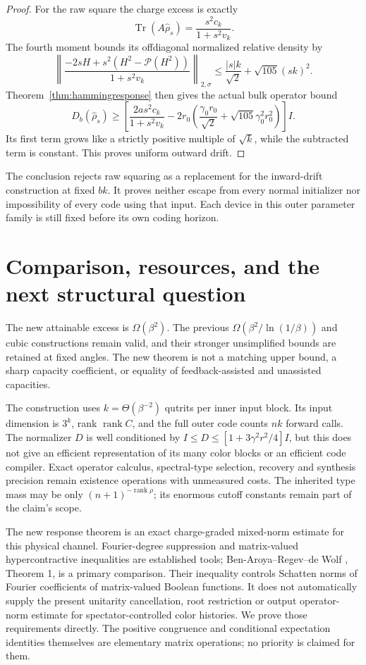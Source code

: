 \documentclass[11pt]{article}
\newcommand{\Tr}{\operatorname{Tr}}
\newcommand{\rank}{\operatorname{rank}}
\newcommand{\pin}{\mathcal P}
\begin{document}
\begin{proof}
For the raw square the charge excess is exactly
\[
 \Tr(A\widehat\rho_s)=\frac{s^2c_k}{1+s^2v_k}.
\]
The fourth moment bounds its offdiagonal normalized relative density by
\[
 \left\|\frac{-2sH+s^2(H^2-\pin(H^2))}{1+s^2v_k}\right\|_{2,\sigma}
 \le\frac{|s|k}{\sqrt2}+\sqrt{105}(sk)^2.
\]
Theorem~\ref{thm:hammingresponse} then gives the actual bulk operator bound
\[
 D_b(\widehat\rho_s)\ge
 \left[\frac{2a s^2c_k}{1+s^2v_k}
 -2r_0\left(\frac{\gamma_0r_0}{\sqrt2}
                  +\sqrt{105}\gamma_0^2r_0^2\right)\right]I.
\]
Its first term grows like a strictly positive multiple of \(\sqrt k\),
while the subtracted term is constant. This proves uniform outward drift.
\end{proof}

The conclusion rejects raw squaring as a replacement for the inward-drift
construction at fixed \(bk\). It proves neither escape from every normal
initializer nor impossibility of every code using that input. Each device
in this outer parameter family is still fixed before its own coding horizon.

\section{Comparison, resources, and the next structural question}

The new attainable excess is \(\Omega(\beta^2)\). The previous
\(\Omega(\beta^2/\ln(1/\beta))\) and cubic constructions remain valid,
and their stronger unsimplified bounds are retained at fixed angles.
The new theorem is not a matching upper bound, a sharp capacity coefficient,
or equality of feedback-assisted and unassisted capacities.

The construction uses \(k=\Theta(\beta^{-2})\) qutrits per inner input
block. Its input dimension is \(3^k\), rank \(\rank C\), and the full
outer code counts \(nk\) forward calls. The normalizer \(D\) is well
conditioned by \(I\le D\le[1+3\gamma^2r^2/4]I\), but this does not
give an efficient representation of its many color blocks or an efficient
code compiler. Exact operator calculus, spectral-type selection, recovery
and synthesis precision remain existence operations with unmeasured costs.
The inherited type mass may be only \((n+1)^{-\rank\rho}\); its enormous
cutoff constants remain part of the claim's scope.

The new response theorem is an exact charge-graded mixed-norm estimate
for this physical channel. Fourier-degree suppression and matrix-valued
hypercontractive inequalities are established tools; Ben-Aroya--Regev--de
Wolf \cite{BRW}, Theorem 1, is a primary comparison. Their inequality
controls Schatten norms of Fourier coefficients of matrix-valued Boolean
functions. It does not automatically supply the present unitarity
cancellation, root restriction or output operator-norm estimate for
spectator-controlled color histories. We prove those requirements directly.
The positive congruence and conditional expectation identities themselves
are elementary matrix operations; no priority is claimed for them.
\end{document}
